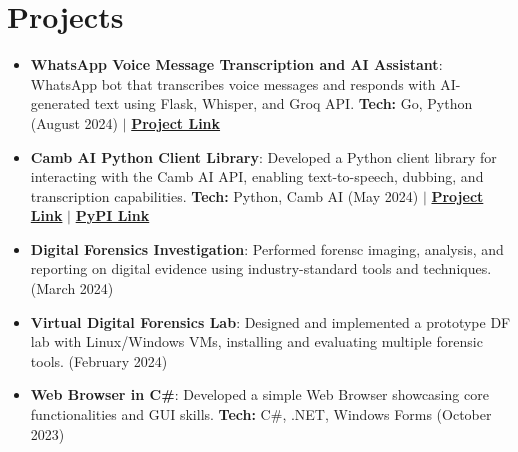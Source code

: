 \documentclass[a4paper,20pt]{article}
\newcommand{\resumeItem}[2] {
	\item\small{
		\textbf{#1}{: #2 \vspace{-2pt}}
	}
}
\newcommand{\resumeSubItem}[2]{\resumeItem{#1}{#2}\vspace{-3pt}}
\newcommand{\resumeSubHeadingListStart}{\begin{itemize}[leftmargin=*]}
\newcommand{\resumeSubHeadingListEnd}{\end{itemize}}
\begin{document}
\section{Projects}
	\resumeSubHeadingListStart
		\resumeSubItem{WhatsApp Voice Message Transcription and AI Assistant}{WhatsApp bot that transcribes voice messages and responds with AI-generated text using Flask, Whisper, and Groq API. \textbf{Tech:} Go, Python (August 2024) $\vert$ \href{https://github.com/cr2007/whatsapp-voice-ai-assistant}{\textbf{Project Link}}}
		\vspace{2pt}
		\resumeSubItem{Camb AI Python Client Library}{Developed a Python client library for interacting with the Camb AI API, enabling text-to-speech, dubbing, and transcription capabilities. \textbf{Tech:} Python, Camb AI (May 2024) $\vert$ \href{https://github.com/cr2007/cambai}{\textbf{Project Link}} $\vert$ \href{https://pypi.org/project/cambai}{\textbf{PyPI Link}}}
		\vspace{2pt}
		\resumeSubItem{Digital Forensics Investigation}{Performed forensc imaging, analysis, and reporting on digital evidence using industry-standard tools and techniques. (March 2024)}
		\vspace{2pt}
		\resumeSubItem{Virtual Digital Forensics Lab}{Designed and implemented a prototype DF lab with Linux/Windows VMs, installing and evaluating multiple forensic tools. (February 2024)}
		\vspace{2pt}
		\resumeSubItem{Web Browser in C\#}{Developed a simple Web Browser showcasing core functionalities and GUI skills. \textbf{Tech:} C\#, .NET, Windows Forms (October 2023)}
		\vspace{2pt}
	\resumeSubHeadingListEnd
\vspace{-3pt}

\end{document}
